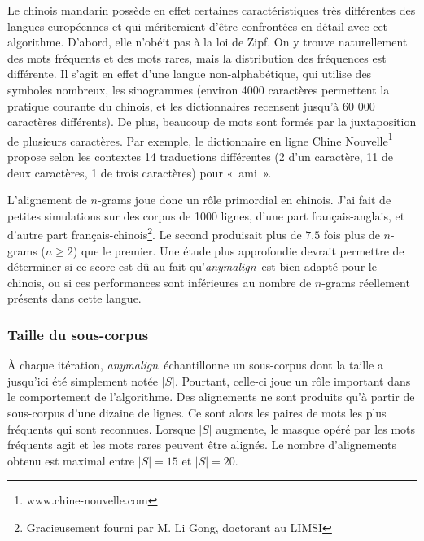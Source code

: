 \documentclass[a4paper,10pt]{article}
\newcommand{\anym}{\emph{anymalign}}
\newcommand{\guill}[1]{«~#1~»}
\begin{document}
Le chinois mandarin possède en effet certaines caractéristiques très différentes des langues européennes et qui mériteraient d'être confrontées en détail avec cet algorithme. D'abord, elle n'obéit pas à la loi de Zipf. On y trouve naturellement des mots fréquents et des mots rares, mais la distribution des fréquences est différente. Il s'agit en effet d'une langue non-alphabétique, qui utilise des symboles nombreux, les sinogrammes (environ 4000 caractères permettent la pratique courante du chinois, et les dictionnaires recensent jusqu'à 60 000 caractères différents). De plus, beaucoup de mots sont formés par la juxtaposition de plusieurs caractères. Par exemple, le dictionnaire en ligne Chine Nouvelle\footnote{www.chine-nouvelle.com} propose selon les contextes 14 traductions différentes (2 d'un caractère, 11 de deux caractères, 1 de trois caractères) pour \guill{ami}.


L'alignement de $n$-grams joue donc un rôle primordial en chinois. J'ai fait de petites simulations sur des corpus de 1000 lignes, d'une part français-anglais, et d'autre part français-chinois\footnote{Gracieusement fourni par M. Li Gong, doctorant au LIMSI}. Le second produisait plus de $7.5$ fois plus de $n$-grams ($n\geq2$) que le premier. Une étude plus approfondie devrait permettre de déterminer si ce score est dû au fait qu'\anym~est bien adapté pour le chinois, ou si ces performances sont inférieures au nombre de $n$-grams réellement présents dans cette langue.



\subsubsection{Taille du sous-corpus}

\`A chaque itération, \anym~échantillonne un sous-corpus dont la taille a jusqu'ici été simplement notée $|S|$. Pourtant, celle-ci joue un rôle important dans le comportement de l'algorithme. Des alignements ne sont produits qu'à partir de sous-corpus d'une dizaine de lignes. Ce sont alors les paires de mots les plus fréquents qui sont reconnues. Lorsque $|S|$ augmente, le masque opéré par les mots fréquents agit et les mots rares peuvent être alignés. Le nombre d'alignements obtenu est maximal entre $|S|=15$ et $|S|=20$.
\end{document}
